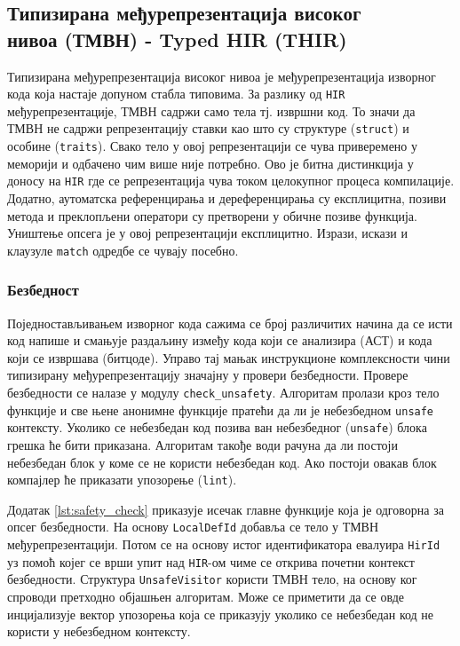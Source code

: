 \subsection{Типизирана међурепрезентација високог \\ нивоа (ТМВН) - Typed HIR (THIR)}

Типизирана међурепрезентација високог нивоа је међурепрезентација изворног кода која настаје допуном стабла типовима.
За разлику од \verb|HIR| међурепрезентације, ТМВН садржи само тела тј. извршни код. То значи да ТМВН 
не садржи репрезентацију ставки као што су структуре (\verb|struct|) и особине (\verb|traits|). Свако тело у овој репрезентацији
се чува приверемено у меморији и одбачено чим више није потребно. Ово је битна дистинкција у доносу на \verb|HIR| где се репрезентација 
чува током целокупног процеса компилације. Додатно, аутоматска референцирања и дереференцирања су експлицитна, позиви метода и 
преклопљени оператори су претворени у обичне позиве функција. Уништење опсега је у овој репрезентацији експлицитно.
Изрази, искази и клаузуле \verb|match| одредбе се чувају посебно.

\subsubsection{Безбедност}

Поједностављивањем изворног кода сажима се број различитих начина да се исти код напише и смањује раздаљину између 
кода који се анализира (АСТ) и кода који се извршава (битцоде).
Управо тај мањак инструкционе комплексности чини типизирану међурепрезентацију значајну у провери безбедности. 
Провере безбедности се налазе у модулу \verb|check_unsafety|.
Алгоритам пролази кроз тело функције и све њене анонимне функције пратећи да ли је небезбедном \verb|unsafe| контексту.
Уколико се небезбедан код позива ван небезбедног (\verb|unsafe|) блока грешка ће бити приказана. Алгоритам такође води рачуна да ли 
постоји небезбедан блок у коме се не користи небезбедан код. Ако постоји овакав блок компајлер ће приказати упозорење (\verb|lint|).

Додатак \ref{lst:safety_check} приказује исечак главне функције која је одговорна за опсег безбедности. 
На основу \verb|LocalDefId| добавља се тело у ТМВН међурепрезентацији. Потом се на основу истог 
идентификатора евалуира \verb|HirId| уз помоћ којег се врши упит над \verb|HIR|-ом чиме се открива почетни контекст безбедности.
Структура \verb|UnsafeVisitor| користи ТМВН тело, на основу ког спроводи претходно објашњен алгоритам. Може се приметити 
да се овде инцијализује вектор упозорења која се приказују уколико се небезбедан код не користи у небезбедном контексту.

